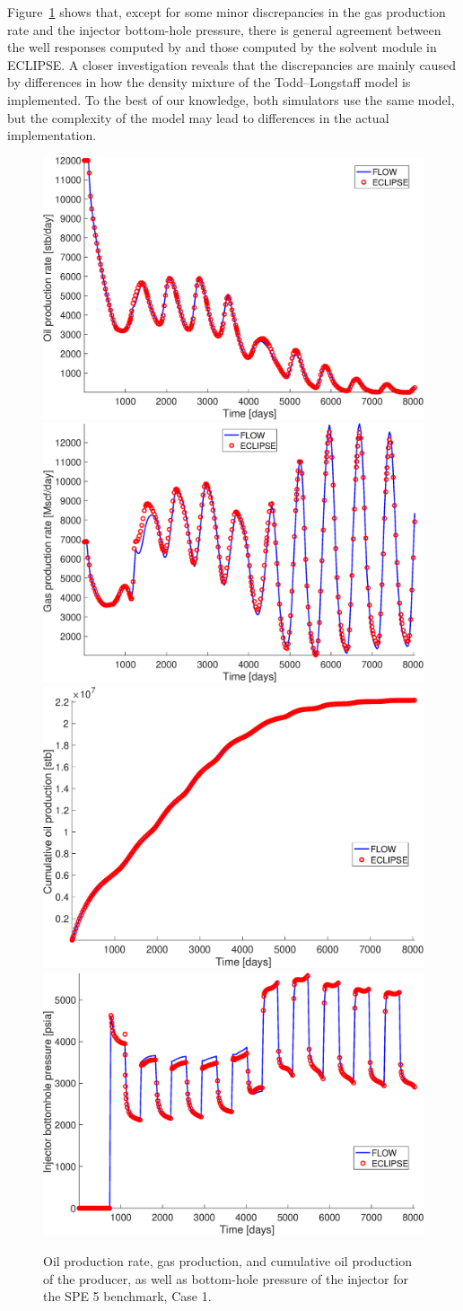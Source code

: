 Figure~\ref{fig:spe5_results} shows that, except for some minor discrepancies in the gas
production rate and the injector bottom-hole pressure, there is general agreement between
the well responses computed by \opmflow and those computed by the solvent module in
ECLIPSE. A closer investigation reveals that the discrepancies are mainly caused by
differences in how the density mixture of the Todd--Longstaff model is implemented. To the
best of our knowledge, both simulators {\revised use} the same model, but the complexity of the
model may lead to differences in the actual implementation.
%
\begin{figure}
  \includegraphics[width=.49\textwidth]{figures/spe5/spe5-wopr}\hfill
  \includegraphics[width=.49\textwidth]{figures/spe5/spe5-wgpr}\\
  \includegraphics[width=.49\textwidth]{figures/spe5/spe5-wopt}\hfill
  \includegraphics[width=.49\textwidth]{figures/spe5/spe5-bhpi}
  \caption{Oil production rate, gas production, and cumulative oil
    production of the producer, as well as bottom-hole pressure of the
    injector for the SPE 5 benchmark, Case 1.}
  \label{fig:spe5_results}
\end{figure}

